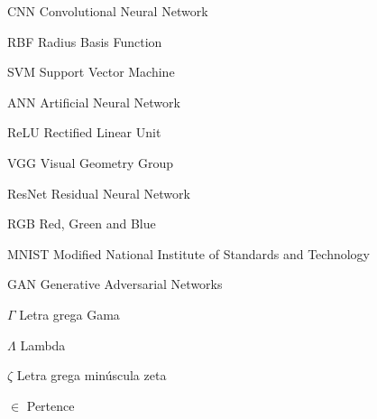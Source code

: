 \documentclass[
	12pt,				%
	oneside,			%
	a4paper,			%
	english,			%
	brazil				%
	]{abntex2ppgsi}
\begin{document}
\listofalgorithms
\cleardoublepage

\listofquadros*
\cleardoublepage


\listoftables*
\cleardoublepage

%
%
\begin{siglas}
  \item[CNN] Convolutional Neural Network
  \item[RBF] Radius Basis Function
  \item[SVM] Support Vector Machine
  \item[ANN] Artificial Neural Network
  \item[ReLU] Rectified Linear Unit
  \item[VGG] Visual Geometry Group
  \item[ResNet] Residual Neural Network
  \item[RGB] Red, Green and Blue
  \item[MNIST] Modified National Institute of Standards and Technology
  \item[GAN] Generative Adversarial Networks
\end{siglas}

%
% 
\begin{simbolos}
  \item[$ \Gamma $] Letra grega Gama
  \item[$ \Lambda $] Lambda
  \item[$ \zeta $] Letra grega minúscula zeta
  \item[$ \in $] Pertence
\end{simbolos}
\end{document}
